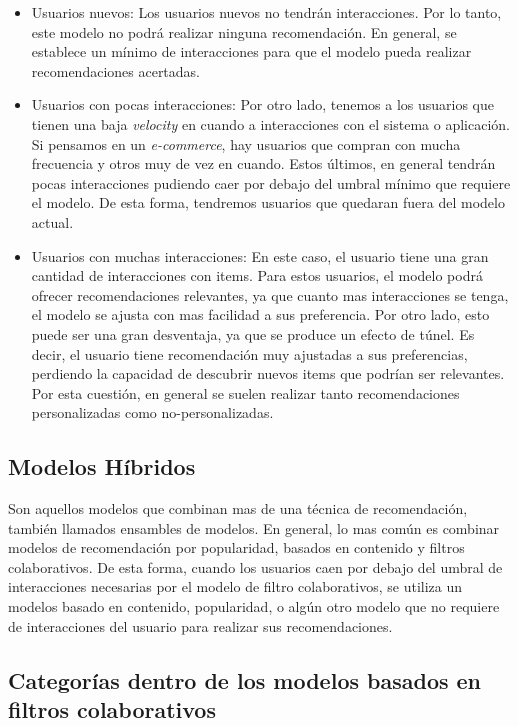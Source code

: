 \documentclass[11pt,a4paper,twoside]{thesis}
\begin{document}
\begin{itemize}
	\item Usuarios nuevos: Los usuarios nuevos no tendrán interacciones. Por lo tanto, este modelo no podrá realizar ninguna recomendación. En general, se establece un mínimo de interacciones para que el modelo pueda realizar recomendaciones acertadas.
	\item Usuarios con pocas interacciones: Por otro lado, tenemos a los usuarios que tienen una baja \textit{velocity} en cuando a interacciones con el sistema o aplicación. Si pensamos en un \textit{e-commerce}, hay usuarios que compran con mucha frecuencia y otros muy de vez en cuando. Estos últimos, en general tendrán pocas interacciones pudiendo caer por debajo del umbral mínimo que requiere el modelo. De esta forma, tendremos usuarios que quedaran fuera del modelo actual.
	\item Usuarios con muchas interacciones: En este caso, el usuario tiene una gran cantidad de interacciones con items. Para estos usuarios, el modelo podrá ofrecer recomendaciones relevantes, ya que cuanto mas interacciones se tenga, el modelo se ajusta con mas facilidad a sus preferencia. Por otro lado, esto puede ser una gran desventaja, ya que se produce un efecto de túnel. Es decir, el usuario tiene recomendación muy ajustadas a sus preferencias, perdiendo la capacidad de descubrir nuevos items que podrían ser relevantes. Por esta cuestión, en general se suelen realizar tanto recomendaciones personalizadas como no-personalizadas.


\end{itemize}

\clearpage
\subsection{Modelos Híbridos}

Son aquellos modelos que combinan mas de una técnica de recomendación, también llamados ensambles de modelos. En general, lo mas común es combinar modelos de recomendación por popularidad, basados en contenido y filtros colaborativos. De esta forma, cuando los usuarios caen por debajo del umbral de interacciones necesarias por el modelo de filtro colaborativos, se utiliza un modelos basado en contenido, popularidad, o algún otro modelo que no requiere de interacciones del usuario para realizar sus recomendaciones.

\subsection{Categorías dentro de los modelos basados en filtros colaborativos} 
\end{document}
